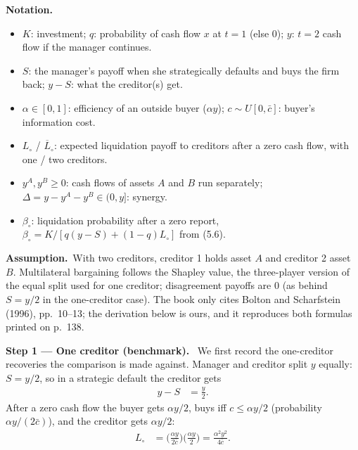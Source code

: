 \documentclass[11pt,a4paper]{article}
\newcommand{\notation}{\par\noindent\textbf{Notation.}}
\newcommand{\step}[2]{\par\medskip\noindent\textbf{Step #1 --- #2.}~}
\newcommand{\assume}{\par\smallskip\noindent\textbf{Assumption.}~}
\begin{document}
\notation
\begin{itemize}
  \item $K$: investment; $q$: probability of cash flow $x$ at $t=1$ (else 0); $y$: $t=2$ cash flow if the manager continues.
  \item $S$: the manager's payoff when she strategically defaults and buys the firm back; $y-S$: what the creditor(s) get.
  \item $\alpha\in[0,1]$: efficiency of an outside buyer ($\alpha y$); $c\sim U[0,\bar c]$: buyer's information cost.
  \item $L_\circ$ / $\overline L_\circ$: expected liquidation payoff to creditors after a zero cash flow, with one / two creditors.
  \item $y^A,y^B\ge0$: cash flows of assets $A$ and $B$ run separately; $\Delta=y-y^A-y^B\in(0,y]$: synergy.
  \item $\beta_\circ$: liquidation probability after a zero report, $\beta_\circ=K/[q(y-S)+(1-q)L_\circ]$ from (5.6).
\end{itemize}
\assume With two creditors, creditor 1 holds asset $A$ and creditor 2 asset $B$. Multilateral bargaining follows the
Shapley value, the three-player version of the equal split used for one creditor; disagreement payoffs are 0
(as behind $S=y/2$ in the one-creditor case). The book only cites Bolton and Scharfstein (1996), pp.~10--13;
the derivation below is ours, and it reproduces both formulas printed on p.~138.

\step{1}{One creditor (benchmark)} We first record the one-creditor recoveries the comparison is made
against. Manager and creditor split $y$ equally: $S=y/2$, so in a strategic default the creditor gets
\begin{align}
  y-S &= \frac{y}{2}. \label{t5e10-s1}
\end{align}
After a zero cash flow the buyer gets $\alpha y/2$, buys iff $c\le\alpha y/2$ (probability $\alpha y/(2\bar c)$), and the creditor gets $\alpha y/2$:
\begin{align}
  L_\circ &= \Big(\frac{\alpha y}{2\bar c}\Big)\Big(\frac{\alpha y}{2}\Big) = \frac{\alpha^2y^2}{4\bar c}. \label{t5e10-L1}
\end{align}
\end{document}

